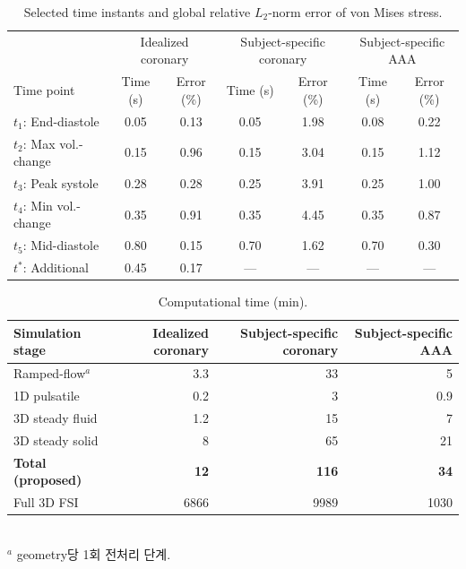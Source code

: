 \documentclass[master,english,final]{kaist-ucs}
\begin{document}
\begin{table}[ht]
\caption[L2 error of von Mises stress]{Selected time instants and global relative $L_2$-norm error of von Mises stress.}
\label{tab:val-l2-error}
\begin{center}
\begin{tabular}{lcccccc}
\hline\hline
& \multicolumn{2}{c}{Idealized coronary} & \multicolumn{2}{c}{Subject-specific coronary} & \multicolumn{2}{c}{Subject-specific AAA} \\
Time point & Time (s) & Error (\%) & Time (s) & Error (\%) & Time (s) & Error (\%) \\
\hline
$t_1$: End-diastole & 0.05 & 0.13 & 0.05 & 1.98 & 0.08 & 0.22 \\
$t_2$: Max vol.-change & 0.15 & 0.96 & 0.15 & 3.04 & 0.15 & 1.12 \\
$t_3$: Peak systole & 0.28 & 0.28 & 0.25 & 3.91 & 0.25 & 1.00 \\
$t_4$: Min vol.-change & 0.35 & 0.91 & 0.35 & 4.45 & 0.35 & 0.87 \\
$t_5$: Mid-diastole & 0.80 & 0.15 & 0.70 & 1.62 & 0.70 & 0.30 \\
$t^{*}$: Additional & 0.45 & 0.17 & --- & --- & --- & --- \\
\hline\hline
\end{tabular}
\end{center}
\end{table}

\begin{table}[ht]
\caption[Computational time]{Computational time (min).}
\label{tab:val-cost}
\begin{center}
\begin{tabular}{lrrr}
\hline\hline
Simulation stage & Idealized coronary & Subject-specific coronary & Subject-specific AAA \\
\hline
Ramped-flow$^{a}$ & 3.3 & 33 & 5 \\
1D pulsatile & 0.2 & 3 & 0.9 \\
3D steady fluid & 1.2 & 15 & 7 \\
3D steady solid & 8 & 65 & 21 \\
\textbf{Total (proposed)} & \textbf{12} & \textbf{116} & \textbf{34} \\
Full 3D FSI & 6866 & 9989 & 1030 \\
\hline\hline
\end{tabular}\\
$^{a}$ geometry당 1회 전처리 단계.
\end{center}
\end{table}
\end{document}
